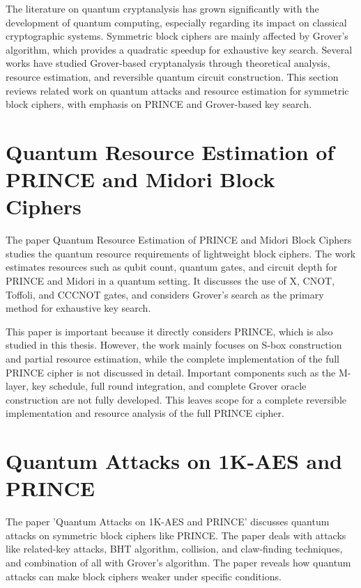 \documentclass[12pt,a4paper]{report}
\begin{document}
The literature on quantum cryptanalysis has grown significantly with the development of quantum computing, especially regarding its impact on classical cryptographic systems. Symmetric block ciphers are mainly affected by Grover's algorithm, which provides a quadratic speedup for exhaustive key search. Several works have studied Grover-based cryptanalysis through theoretical analysis, resource estimation, and reversible quantum circuit construction. This section reviews related work on quantum attacks and resource estimation for symmetric block ciphers, with emphasis on PRINCE and Grover-based key search.

\section{Quantum Resource Estimation of PRINCE and Midori Block Ciphers}

The paper Quantum Resource Estimation of PRINCE and Midori Block Ciphers studies the quantum resource requirements of lightweight block ciphers. The work estimates resources such as qubit count, quantum gates, and circuit depth for PRINCE and Midori in a quantum setting. It discusses the use of X, CNOT, Toffoli, and CCCNOT gates, and considers Grover's search as the primary method for exhaustive key search.

This paper is important because it directly considers PRINCE, which is also studied in this thesis. However, the work mainly focuses on S-box construction and partial resource estimation, while the complete implementation of the full PRINCE cipher is not discussed in detail. Important components such as the M-layer, key schedule, full round integration, and complete Grover oracle construction are not fully developed. This leaves scope for a complete reversible implementation and resource analysis of the full PRINCE cipher.

\section{Quantum Attacks on 1K-AES and PRINCE}

The paper 'Quantum Attacks on 1K-AES and PRINCE' discusses quantum attacks on symmetric block ciphers like PRINCE. The paper deals with attacks like related-key attacks, BHT algorithm, collision, and claw-finding techniques, and combination of all with Grover's algorithm. The paper reveals how quantum attacks can make block ciphers weaker under specific conditions.
\end{document}
